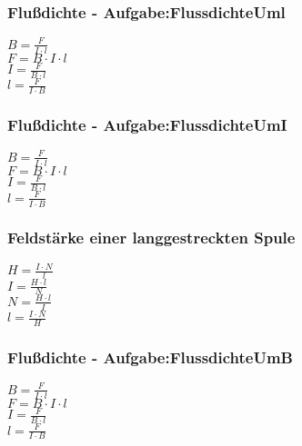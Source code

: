 \subsubsection{Flußdichte - Aufgabe:FlussdichteUml} 
\begin{minipage}{0.45\textwidth} 
$ B = \frac{ F}{I\cdot l} $\\ 
$ F = B\cdot I\cdot l $\\ 
$ I = \frac{ F}{B\cdot l} $\\ 
$ l = \frac{ F}{I\cdot B} $\\ 
\end{minipage} 
\begin{minipage}{0.45\textwidth} 
 
\end{minipage} 
\subsubsection{Flußdichte - Aufgabe:FlussdichteUmI} 
\begin{minipage}{0.45\textwidth} 
$ B = \frac{ F}{I\cdot l} $\\ 
$ F = B\cdot I\cdot l $\\ 
$ I = \frac{ F}{B\cdot l} $\\ 
$ l = \frac{ F}{I\cdot B} $\\ 
\end{minipage} 
\begin{minipage}{0.45\textwidth} 
 
\end{minipage} 
\subsubsection{Feldstärke einer langgestreckten Spule} 
\begin{minipage}{0.45\textwidth} 
$ H = \frac{I\cdot N}{ l} $\\ 
$ I = \frac{H\cdot l}{ N} $\\ 
$ N = \frac{H\cdot l}{ I} $\\ 
$ l = \frac{I\cdot N}{ H} $\\ 
\end{minipage} 
\begin{minipage}{0.45\textwidth} 
 
\end{minipage} 
\subsubsection{Flußdichte - Aufgabe:FlussdichteUmB} 
\begin{minipage}{0.45\textwidth} 
$ B = \frac{ F}{I\cdot l} $\\ 
$ F = B\cdot I\cdot l $\\ 
$ I = \frac{ F}{B\cdot l} $\\ 
$ l = \frac{ F}{I\cdot B} $\\ 
\end{minipage} 
\begin{minipage}{0.45\textwidth} 
 
\end{minipage} 
